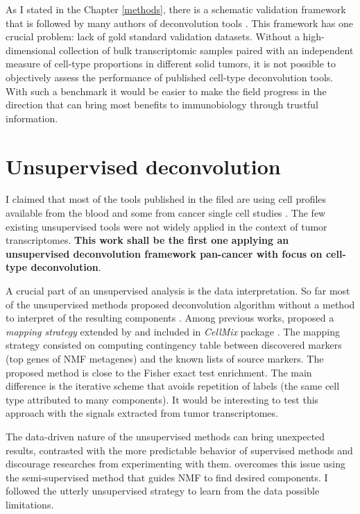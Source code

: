 \documentclass[12pt,]{book}
\theoremstyle{definition}
\theoremstyle{definition}
\theoremstyle{definition}
\theoremstyle{remark}
\begin{document}
As I stated in the Chapter \ref{methods}, there is a schematic
validation framework that is followed by many authors of deconvolution
tools \citep[i.e.,][]{Racle2017, Newman2015, Aran2017, Becht2016}. This
framework has one crucial problem: lack of gold standard validation
datasets. Without a high-dimensional collection of bulk transcriptomic
samples paired with an independent measure of cell-type proportions in
different solid tumors, it is not possible to objectively assess the
performance of published cell-type deconvolution tools. With such a
benchmark it would be easier to make the field progress in the direction
that can bring most benefits to immunobiology through trustful
information.

\hypertarget{unsupervised-deconvolution-1}{%
\section{Unsupervised
deconvolution}\label{unsupervised-deconvolution-1}}

I claimed that most of the tools published in the filed are using cell
profiles available from the blood\citep{Newman2015, Aran2017, Becht2016}
and some from cancer single cell studies
\citep{Racle2017, Schelker2017}. The few existing unsupervised tools
\citep{Repsilber2010, Wang2016, Gaujoux2010} were not widely applied in
the context of tumor transcriptomes. \textbf{This work shall be the
first one applying an unsupervised deconvolution framework pan-cancer
with focus on cell-type deconvolution}.

A crucial part of an unsupervised analysis is the data interpretation.
So far most of the unsupervised methods proposed deconvolution algorithm
without a method to interpret of the resulting components
\citep{Newberg2018, Wang2016}. Among previous works,
\citet{Repsilber2010} proposed a \emph{mapping strategy} extended by
\citet{Gaujoux2012} and included in \emph{CellMix} package
\citep{Gaujoux2013}. The mapping strategy consisted on computing
contingency table between discovered markers (top genes of NMF
metagenes) and the known lists of source markers. The proposed method is
close to the Fisher exact test enrichment. The main difference is the
iterative scheme that avoids repetition of labels (the same cell type
attributed to many components). It would be interesting to test this
approach with the signals extracted from tumor transcriptomes.

The data-driven nature of the unsupervised methods can bring unexpected
results, contrasted with the more predictable behavior of supervised
methods and discourage researches from experimenting with them.
\citet{Gaujoux2012} overcomes this issue using the semi-supervised
method that guides NMF to find desired components. I followed the
utterly unsupervised strategy to learn from the data possible
limitations.
\end{document}
